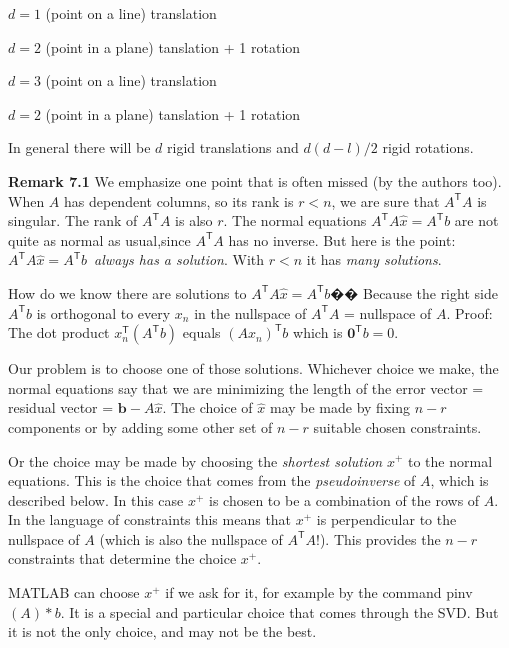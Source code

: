 \begin{center}
	\par
	$d = 1$ \qquad (point on a line)  translation
	\par
	\qquad$d = 2$ \qquad (point in a plane) tanslation + 1 rotation
	\par
	$d = 3$ \qquad (point on a line)  translation
	\par
	\qquad$d = 2$ \qquad (point in a plane) tanslation + 1 rotation
\end{center}
\par \noindent
In general there will be $d$ rigid translations and $d(d - l)/2$ rigid rotations.
\par \noindent
\textbf{Remark 7.1} We emphasize one point that is often missed (by the authors too). When $A$ has dependent columns, so its rank is $r < n$, we are sure that $A^\mathsf{T}A$ is singular. The rank of $A^\mathsf{T}A$ is also $r$. The normal equations $A^\mathsf{T}A\hat{x} = A^\mathsf{T}b$ are not quite as normal as usual,since $A^\mathsf{T}A$ has no inverse. But here is the point: $A^\mathsf{T}A\hat{x} = A^\mathsf{T}b$\ \emph{always has a solution}. With $r < n$ it has \emph{many solutions}.
\par
How do we know there are solutions to $A^\mathsf{T}A\hat{x} = A^\mathsf{T}b$�� Because the right side $A^\mathsf{T}b$ is orthogonal to every $x_n$ in the nullspace of $A^\mathsf{T}A$ = nullspace of $A$. Proof: The dot product $x_n^ \mathsf{T}( A^\mathsf{T}b)$ equals $(Ax_n)^\mathsf{T}b$ which is $\mathbf{0}^\mathsf{T}b = 0$.
\par
Our problem is to choose one of those solutions. Whichever choice we make, the normal equations say that we are minimizing the length of the error vector = residual vector = $\mathbf{b} - A\hat{x}$. The choice of $\hat{x}$ may be made by fixing $n - r$ components or by adding some other set of $n - r$ suitable chosen constraints.
\par
Or the choice may be made by choosing the \emph{shortest solution} ${x^+}$ to the normal equations. This is the choice that comes from the \emph{pseudoinverse} of $A$, which is described below. In this case ${x^+}$ is chosen to be a combination of the rows of $A$. In the language of constraints this means that ${x^+}$ is perpendicular to the nullspace of $A$ (which is also the nullspace of $A^\mathsf{T}A$!). This provides the $n - r$ constraints that determine the choice ${x^+}$.
\par
MATLAB can choose ${x^+}$ if we ask for it, for example by the command pinv$(A) * b$. It is a special and particular choice that comes through the SVD. But it is not the only choice, and may not be the best.

